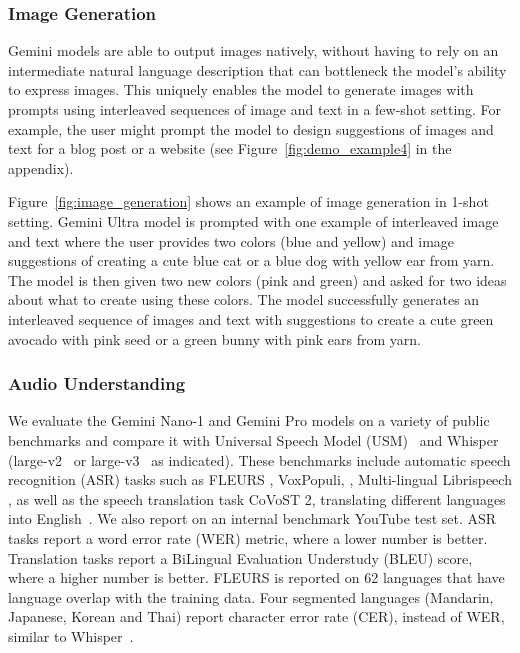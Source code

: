 \subsubsection{Image Generation}
\label{sec:imagegen}
Gemini models are able to output images natively, without having to rely on an intermediate natural language description that can bottleneck the model's ability to express images. This uniquely enables the model to generate images with prompts using interleaved sequences of image and text in a few-shot setting. For example, the user might prompt the model to design suggestions of images and text for a blog post or a website (see Figure~\ref{fig:demo_example4} in the appendix).

Figure~\ref{fig:image_generation} shows an example of image generation in 1-shot setting. Gemini Ultra model is prompted with one example of interleaved image and text where the user provides two colors (blue and yellow) and image suggestions of creating a cute blue cat or a blue dog with yellow ear from yarn. The model is then given two new colors (pink and green) and asked for two ideas about what to create using these colors. The model successfully generates an interleaved sequence of images and text with suggestions to create a cute green avocado with pink seed or a green bunny with pink ears from yarn. 

\subsubsection{Audio Understanding}
\label{sec:audio}
We evaluate the Gemini Nano-1 and Gemini Pro models on a variety of public benchmarks and compare it with Universal Speech Model (USM)~\cite{usm} and Whisper (large-v2~\cite{whisper} or large-v3~\cite{whisper-v3} as indicated). These benchmarks include automatic speech recognition (ASR) tasks such as FLEURS \cite{conneau2023fleurs}, VoxPopuli, \cite{wang2021voxpopuli}, Multi-lingual Librispeech \cite{pratap2020mls}, as well as the speech translation task CoVoST 2, translating different languages into English~\cite{wang2020covost}. We also report on an internal benchmark YouTube test set. ASR tasks report a word error rate (WER) metric, where a lower number is better. Translation tasks report a BiLingual Evaluation Understudy (BLEU) score, where a higher number is better. FLEURS is reported on 62 languages that have language overlap with the training data. Four segmented languages (Mandarin, Japanese, Korean and Thai) report character error rate (CER), instead of WER, similar to Whisper~\cite{whisper}.

